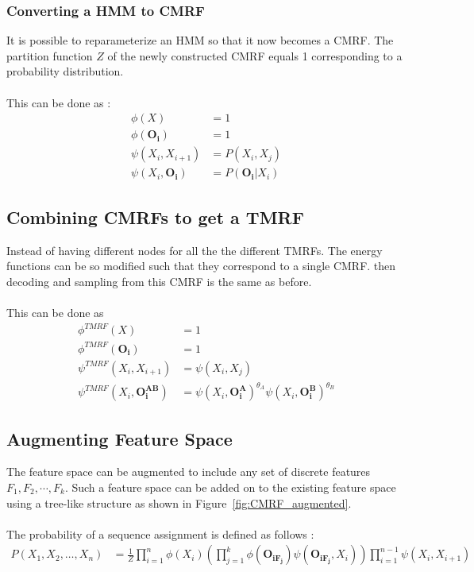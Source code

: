 \documentclass{article}
\begin{document}
\subsubsection{Converting a HMM to CMRF}
It is possible to reparameterize an HMM so that it now becomes a CMRF. The partition function $Z$ of the newly constructed CMRF equals 1 corresponding to a probability distribution.
\\
\\
This can be done as :
\begin{align*}
\phi(X) &= 1 \\
\phi(\mathbf{O_i})&=1 \\
\psi(X_i,X_{i+1}) &= P(X_i,X_j)\\
\psi(X_i,\mathbf{O_i}) &= P(\mathbf{O_i}|X_i)
\end{align*}

\subsection{Combining CMRFs to get a TMRF}
Instead of having different nodes for all the the different TMRFs. The energy functions can be so modified such that they correspond to a single CMRF. then decoding and sampling from this CMRF is the same as before. 
\\
\\
This can be done as 
\begin{align*}
\phi^{TMRF}(X) &= 1 \\
\phi^{TMRF}(\mathbf{O_i}) &= 1 \\
\psi^{TMRF}(X_i,X_{i+1}) &= \psi(X_i,X_j)\\
\psi^{TMRF}(X_i,\mathbf{O_i^{AB}}) &= \psi(X_i,\mathbf{O_i^A})^{\theta_A}\psi(X_i,\mathbf{O_i^B})^{\theta_B}
\end{align*}

\subsection{Augmenting Feature Space}
The feature space can be augmented to include any set of discrete features $F_1,F_2,\cdots,F_k$. Such a feature space can be added on to the existing feature space using a tree-like structure as shown in Figure~\ref{fig:CMRF_augmented}. 
\\
\\
The probability of a sequence assignment is defined as follows :
\begin{align*}
P(X_1,X_2,\dotsc,X_n) &= \frac{1}{Z}\prod_{i=1}^{n} \phi(X_i)\left(\prod_{j=1}^{k}\phi(\mathbf{O_{iF_j}})\psi(\mathbf{O_{iF_j}},X_i)\right) \prod_{i=1}^{n-1}{\psi(X_i,X_{i+1})} 
\end{align*}
\end{document}
